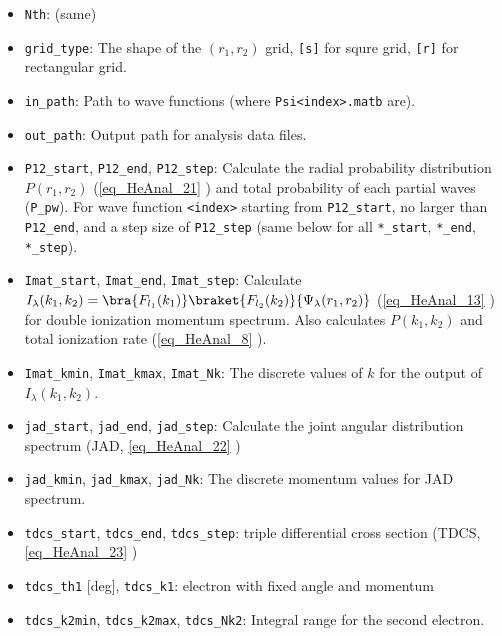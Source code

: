 
\begin{itemize}
\item \verb`Nth`: (same)
\item \verb`grid_type`: The shape of the $(r_1,r_2)$ grid, \verb`[s]` for squre grid, \verb`[r]` for rectangular grid.
\item \verb`in_path`: Path to wave functions (where \verb`Psi<index>.matb` are).
\item \verb`out_path`: Output path for analysis data files.

\item \verb`P12_start`, \verb`P12_end`, \verb`P12_step`: Calculate the radial probability distribution $P(r_1, r_2)$ (\autoref{eq_HeAnal_21} ) and total probability of each partial waves (\verb`P_pw`). For wave function \verb`<index>` starting from \verb`P12_start`, no larger than \verb`P12_end`, and a step size of \verb`P12_step` (same below for all \verb`*_start`, \verb`*_end`, \verb`*_step`).

\item \verb`Imat_start`, \verb`Imat_end`, \verb`Imat_step`: Calculate $I_\lambda(k_1, k_2) = \bra{F_{l_1}(k_1)}\braket{F_{l_2}(k_2)}{\Psi_\lambda(r_1,r_2)}$ (\autoref{eq_HeAnal_13} ) for double ionization momentum spectrum. Also calculates $P(k_1,k_2)$ and total ionization rate (\autoref{eq_HeAnal_8} ).
\item \verb`Imat_kmin`, \verb`Imat_kmax`, \verb`Imat_Nk`: The discrete values of $k$ for the output of $I_\lambda(k_1, k_2)$.
\item \verb`jad_start`, \verb`jad_end`, \verb`jad_step`: Calculate the joint angular distribution spectrum (JAD, \autoref{eq_HeAnal_22} )
\item \verb`jad_kmin`, \verb`jad_kmax`, \verb`jad_Nk`: The discrete momentum values for JAD spectrum.

\item \verb`tdcs_start`, \verb`tdcs_end`, \verb`tdcs_step`: triple differential cross section (TDCS, \autoref{eq_HeAnal_23} )
\item \verb`tdcs_th1` [deg], \verb`tdcs_k1`: electron with fixed angle and momentum
\item \verb`tdcs_k2min`, \verb`tdcs_k2max`, \verb`tdcs_Nk2`: Integral range for the second electron.


\end{itemize}
